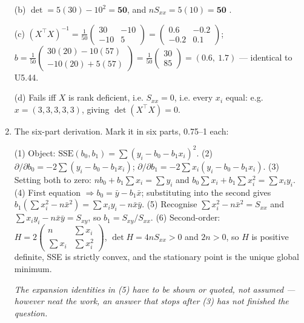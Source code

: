 \documentclass[11pt,a4paper]{article}
\newcommand{\A}[1]{\item[\textbf{#1}]}
\begin{document}
\begin{enumerate}[leftmargin=1.9cm]
\begin{answerbox}
(b) $\det = 5(30) - 10^2 = \mathbf{50}$, and $nS_{xx} = 5(10) = \mathbf{50}$
\checkmark.

(c) $(X^\top X)^{-1} = \frac{1}{50}\begin{pmatrix}30 & -10\\ -10 & 5
\end{pmatrix} = \begin{pmatrix}0.6 & -0.2\\ -0.2 & 0.1\end{pmatrix}$;
$b = \frac{1}{50}\begin{pmatrix}30(20)-10(57)\\ -10(20)+5(57)\end{pmatrix}
= \frac{1}{50}\begin{pmatrix}30\\ 85\end{pmatrix} = \mathbf{(0.6,\ 1.7)}$
--- identical to U5.44.

(d) Fails iff $X$ is rank deficient, i.e. $S_{xx} = 0$, i.e. every $x_i$ equal:
e.g. $x = (3,3,3,3,3)$, giving $\det(X^\top X) = 0$.
\end{answerbox}

\A{U5.46} The six-part derivation. Mark it in six parts, 0.75--1 each:
\begin{answerbox}
(1) Object: $\text{SSE}(b_0,b_1) = \sum(y_i - b_0 - b_1x_i)^2$.
(2) $\partial/\partial b_0 = -2\sum(y_i-b_0-b_1x_i)$;
$\partial/\partial b_1 = -2\sum x_i(y_i-b_0-b_1x_i)$.
(3) Setting both to zero: $nb_0 + b_1\sum x_i = \sum y_i$ and
$b_0\sum x_i + b_1\sum x_i^2 = \sum x_iy_i$.
(4) First equation $\Rightarrow b_0 = \bar y - b_1\bar x$; substituting into
the second gives $b_1(\sum x_i^2 - n\bar x^2) = \sum x_iy_i - n\bar x\bar y$.
(5) Recognise $\sum x_i^2 - n\bar x^2 = S_{xx}$ and
$\sum x_iy_i - n\bar x\bar y = S_{xy}$, so $b_1 = S_{xy}/S_{xx}$.
(6) Second-order: $H = 2\begin{pmatrix}n & \sum x_i\\ \sum x_i & \sum x_i^2
\end{pmatrix}$, $\det H = 4nS_{xx} > 0$ and $2n > 0$, so $H$ is positive
definite, SSE is strictly convex, and the stationary point is the unique
global minimum.
\end{answerbox}
\emph{The expansion identities in (5) have to be shown or quoted, not assumed --- however neat the work, an answer that stops after (3) has not finished the question.}


\end{enumerate}
\end{document}
